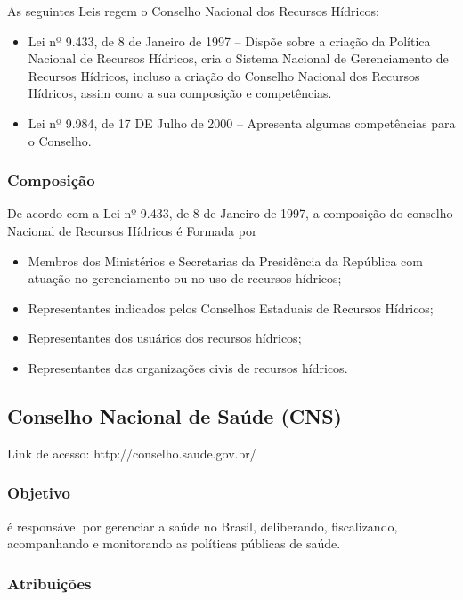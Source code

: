 As seguintes Leis regem o Conselho Nacional dos Recursos Hídricos:

\begin{itemize}
\item 
Lei nº 9.433, de 8 de Janeiro de 1997 -- Dispõe
sobre a criação da Política Nacional de Recursos Hídricos,
cria o Sistema Nacional de Gerenciamento de Recursos Hídricos,
incluso a criação do Conselho Nacional dos Recursos Hídricos,
assim como a sua composição e competências.
\item 
Lei nº 9.984, de 17 DE Julho de 2000 -- Apresenta
algumas competências para o Conselho.
\end{itemize}

\subsubsection*{Composição}

De acordo com a Lei nº 9.433, de 8 de Janeiro de 1997,
a composição do conselho Nacional de Recursos Hídricos é
Formada por

\begin{itemize}
\item 
Membros dos Ministérios e Secretarias da Presidência da República
com atuação no gerenciamento ou no uso de recursos hídricos;
\item 
Representantes indicados pelos Conselhos Estaduais de Recursos
Hídricos;
\item 
Representantes dos usuários dos recursos hídricos;
\item 
Representantes das organizações civis de recursos hídricos.
\end{itemize}
\newpage
\subsection*{Conselho Nacional de Saúde (CNS)}

Link de acesso: http://conselho.saude.gov.br/

\subsubsection*{Objetivo}

é responsável por gerenciar a saúde no Brasil, deliberando,
fiscalizando, acompanhando e monitorando as políticas públicas de
saúde.

\subsubsection*{Atribuições}

